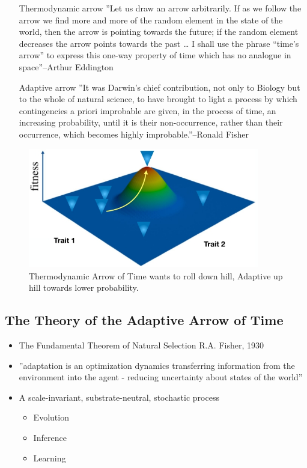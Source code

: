 \documentclass[]{article}
\begin{document}
\begin{itemize}
	\item[Thermodynamic arrow] ''Let us draw an arrow arbitrarily. If as we follow the arrow we find more and more
	of the random element in the state of the world, then the arrow is pointing towards
	the future; if the random element decreases the arrow points towards the past … I
	shall use the phrase “time's arrow” to express this one-way property of time which
	has no analogue in space''--Arthur Eddington\cite{eddington1939philosophy}
	
	\item[Adaptive arrow]''It was Darwin’s chief contribution, not only to Biology but to the whole of natural science, to have brought to light a process by which contingencies a priori
	improbable are given, in the process of time, an increasing probability, until it is their non-occurrence, rather than their occurrence, which becomes highly improbable.''--Ronald Fisher\cite{fisher1930genetical}
\end{itemize}

\begin{figure}[H]
	\caption[Thermodynamic Arrow of Time versus Adaptive ]{Thermodynamic Arrow of Time wants to roll down hill, Adaptive up hill towards lower probability.}\label{fig:NaturalSelection}
	\includegraphics[width=0.9\textwidth]{NaturalSelection}
\end{figure}

\subsection{The Theory of the Adaptive Arrow of Time}

\begin{itemize}
	\item The Fundamental Theorem of Natural Selection
	R.A. Fisher, 1930
	\item ''adaptation is an optimization dynamics
	transferring information
	from the environment into the agent
	- reducing uncertainty about states of the world''\cite{rockmore2018cultural}
	\item A scale-invariant, substrate-neutral, stochastic process
	\begin{itemize}
		\item Evolution
		\item Inference
		\item Learning
	\end{itemize}
\end{itemize}
\end{document}
